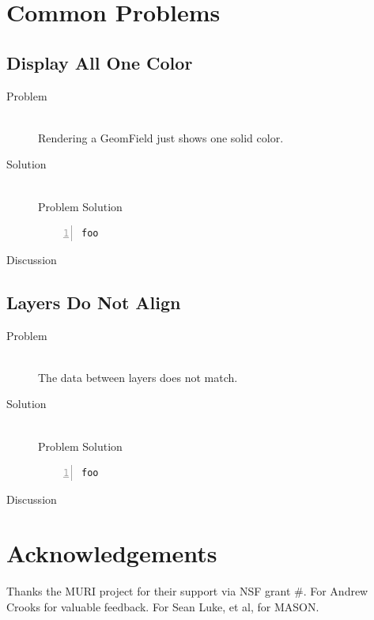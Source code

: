 \documentclass[twoside,10pt]{book}
\newcommand\code[1]{\textsf{#1}}
\begin{document}

\chapter{Common Problems}
\label{ch:commonprobs}


\section{Display All One Color}
\label{sec:OneColorDisplay}

\begin{description}
\item[Problem]~\\
Rendering a \code{GeomField} just shows one solid color.

\item[Solution]~\\
Problem Solution
\begin{Verbatim}[frame=lines,framesep=5mm,numbers=left,commandchars=+\[\]]
foo
\end{Verbatim}

\item[Discussion ]
\end{description}


\section{Layers Do Not Align}
\label{sec:NonAlignedLayers}

\begin{description}
\item[Problem]~\\
The data between layers does not match.

\item[Solution]~\\
Problem Solution
\begin{Verbatim}[frame=lines,framesep=5mm,numbers=left,commandchars=+\[\]]
foo
\end{Verbatim}

\item[Discussion ]
\end{description}


\chapter{Acknowledgements}
\label{ch:ack}

Thanks the MURI project for their support via NSF grant \#.  For Andrew Crooks for
valuable feedback.  For Sean Luke, et al, for MASON.


\cleardoublepage
\footnotesize
{}
\printindex
\end{document}

